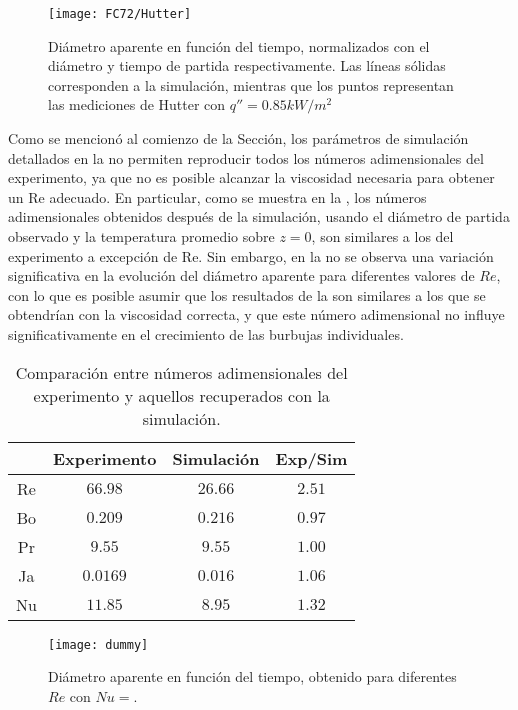 \begin{figure}[ht]
	\centering
	\texttt{[image: FC72/Hutter]}
	\caption{Di\'ametro aparente en funci\'on del tiempo, normalizados con el di\'ametro y tiempo de partida respectivamente. Las l\'ineas s\'olidas corresponden a la simulaci\'on, mientras que los puntos representan las mediciones de Hutter con $q'' = 0.85kW/m^2$}
	\label{fig:d_vs_t}
\end{figure}

Como se mencion\'o al comienzo de la Secci\'on, los par\'ametros de simulaci\'on detallados en la  no permiten reproducir todos los n\'umeros adimensionales del experimento, ya que no es posible alcanzar la viscosidad necesaria para obtener un Re adecuado. En particular, como se muestra en la , los n\'umeros adimensionales obtenidos despu\'es de la simulaci\'on, usando el di\'ametro de partida observado y la temperatura promedio sobre $z=0$, son similares a los del experimento a excepci\'on de Re. Sin embargo, en la  no se observa una variaci\'on significativa en la evoluci\'on del di\'ametro aparente para diferentes valores de $Re$, con lo que es posible asumir que los resultados de la  son similares a los que se obtendr\'ian con la viscosidad correcta, y que este n\'umero adimensional no influye significativamente en el crecimiento de las burbujas individuales.

\begin{table}[ht]
	\centering
    \begin{tabular}{c c c c}
	    \toprule
         & \bf Experimento & \bf Simulaci\'on & \bf Exp/Sim\\
        \midrule
		Re & $66.98$  & $26.66$ & $2.51$ \\
		Bo & $0.209$  & $0.216$ & $0.97$ \\
		Pr & $9.55$   & $9.55$  & $1.00$ \\
		Ja & $0.0169$ & $0.016$ & $1.06$  \\
		Nu & $11.85$  & $8.95$  & $$1.32$$ \\		
        \bottomrule
	\end{tabular}
	\caption{Comparaci\'on entre n\'umeros adimensionales del experimento y aquellos recuperados con la simulaci\'on.}
	\label{tab:adim_reproducidos}
\end{table} 

\begin{figure}[ht]
	\centering
	\texttt{[image: dummy]}
	\caption{Di\'ametro aparente en funci\'on del tiempo, obtenido para diferentes $Re$ con $Nu=$.}
	\label{fig:d_vs_t_Re}
\end{figure}
\FloatBarrier

